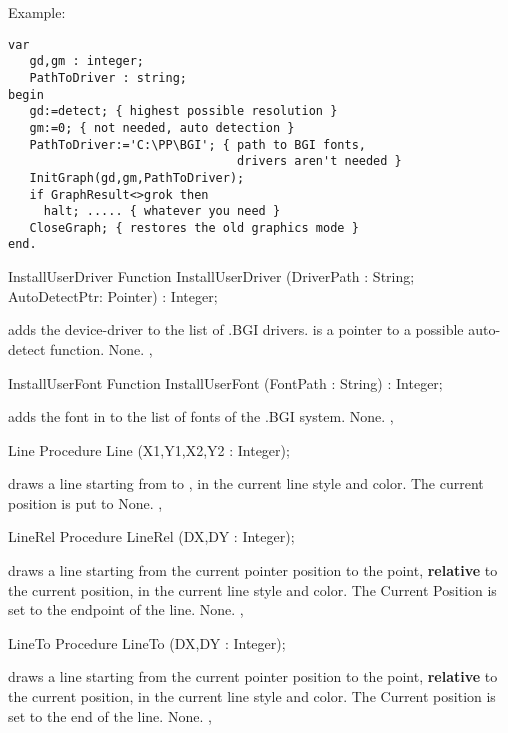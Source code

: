 Example:
\begin{verbatim}
var 
   gd,gm : integer; 
   PathToDriver : string; 
begin 
   gd:=detect; { highest possible resolution } 
   gm:=0; { not needed, auto detection } 
   PathToDriver:='C:\PP\BGI'; { path to BGI fonts, 
                                drivers aren't needed } 
   InitGraph(gd,gm,PathToDriver); 
   if GraphResult<>grok then 
     halt; ..... { whatever you need } 
   CloseGraph; { restores the old graphics mode } 
end.
\end{verbatim}
\begin{function}{InstallUserDriver}
\Declaration
Function InstallUserDriver (DriverPath : String; \\AutoDetectPtr: Pointer) : Integer;

\Description
{} 
adds the device-driver  to the list of .BGI
drivers.  is a pointer to a possible auto-detect function.
\Errors
None.
\SeeAlso
{}, 
\end{function}
\begin{function}{InstallUserFont}
\Declaration
Function InstallUserFont (FontPath : String) : Integer;

\Description
{} adds the font in  to the list of fonts
of the .BGI system.
\Errors
None.
\SeeAlso
{}, 
\end{function}
\begin{procedure}{Line}
\Declaration
Procedure Line (X1,Y1,X2,Y2 : Integer);

\Description
{} draws a line starting from
 to , in the current line style and color. The
current position is put to 
\Errors
None.
\SeeAlso
{},
\end{procedure}
\begin{procedure}{LineRel}
\Declaration
Procedure LineRel (DX,DY : Integer);

\Description
{} draws a line starting from
the current pointer position to the point, \textbf{relative} to the
current position, in the current line style and color. The Current Position
is set to the endpoint of the line.
\Errors
None.
\SeeAlso
{}, 
\end{procedure}
\begin{procedure}{LineTo}
\Declaration
Procedure LineTo (DX,DY : Integer);

\Description
{} draws a line starting from
the current pointer position to the point, \textbf{relative} to the
current position, in the current line style and color. The Current position
is set to the end of the line.
\Errors
None.
\SeeAlso
{},
\end{procedure}
